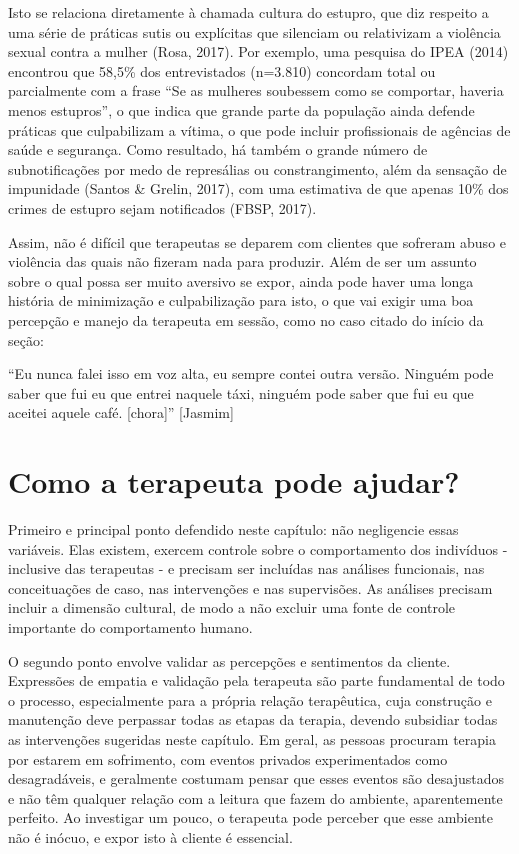 Isto se relaciona diretamente à chamada cultura do estupro, que diz respeito a uma série de práticas sutis ou explícitas que silenciam ou relativizam a violência sexual contra a mulher (Rosa, 2017). Por exemplo, uma pesquisa do IPEA (2014) encontrou que 58,5\% dos entrevistados (n=3.810) concordam total ou parcialmente com a frase ``Se as mulheres soubessem como se comportar, haveria menos estupros'', o que indica que grande parte da população ainda defende práticas que culpabilizam a vítima, o que pode incluir profissionais de agências de saúde e segurança. Como resultado, há também o grande número de subnotificações por medo de represálias ou constrangimento, além da sensação de impunidade (Santos \& Grelin, 2017), com uma estimativa de que apenas 10\% dos crimes de estupro sejam notificados (FBSP, 2017).

Assim, não é difícil que terapeutas se deparem com clientes que sofreram abuso e violência das quais não fizeram nada para produzir. Além de ser um assunto sobre o qual possa ser muito aversivo se expor, ainda pode haver uma longa história de minimização e culpabilização para isto, o que vai exigir uma boa percepção e manejo da terapeuta em sessão, como no caso citado do início da seção:

``Eu nunca falei isso em voz alta, eu sempre contei outra versão. Ninguém pode saber que fui eu que entrei naquele táxi, ninguém pode saber que fui eu que aceitei aquele café. [chora]'' [Jasmim]

\section*{Como a terapeuta pode ajudar?}

Primeiro e principal ponto defendido neste capítulo: não negligencie essas variáveis. Elas existem, exercem controle sobre o comportamento dos indivíduos - inclusive das terapeutas - e precisam ser incluídas nas análises funcionais, nas conceituações de caso, nas intervenções e nas supervisões. As análises precisam incluir a dimensão cultural, de modo a não excluir uma fonte de controle importante do comportamento humano.

O segundo ponto envolve validar as percepções e sentimentos da cliente. Expressões de empatia e validação pela terapeuta são parte fundamental de todo o processo, especialmente para a própria relação terapêutica, cuja construção e manutenção deve perpassar todas as etapas da terapia, devendo subsidiar todas as intervenções sugeridas neste capítulo. Em geral, as pessoas procuram terapia por estarem em sofrimento, com eventos privados experimentados como desagradáveis, e geralmente costumam pensar que esses eventos são desajustados e não têm qualquer relação com a leitura que fazem do ambiente, aparentemente perfeito. Ao investigar um pouco, o terapeuta pode perceber que esse ambiente não é inócuo, e expor isto à cliente é essencial. 


